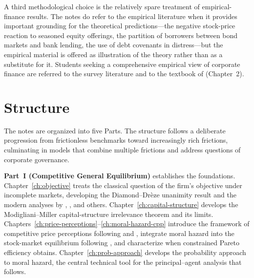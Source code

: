 \documentclass[11pt,a4paper,oneside]{book}
\theoremstyle{plain}
\theoremstyle{definition}
\theoremstyle{remark}
\numberwithin{equation}{chapter}
\begin{document}
A third methodological choice is the relatively spare treatment of empirical-finance results.
The notes do refer to the empirical literature when it provides important grounding for the theoretical predictions---the negative stock-price reaction to seasoned equity offerings, the partition of borrowers between bond markets and bank lending, the use of debt covenants in distress---but the empirical material is offered as illustration of the theory rather than as a substitute for it.
Students seeking a comprehensive empirical view of corporate finance are referred to the survey literature and to the textbook of \citet{Tirole2006} (Chapter~2).

\section*{Structure}

The notes are organized into five Parts.
The structure follows a deliberate progression from frictionless benchmarks toward increasingly rich frictions, culminating in models that combine multiple frictions and address questions of corporate governance.

\textbf{Part~I (Competitive General Equilibrium)} establishes the foundations.
Chapter~\ref{ch:objective} treats the classical question of the firm's objective under incomplete markets, developing the Diamond--Drèze unanimity result and the modern analyses by \citet{MagillQuinzii2008}, \citet{BritzHeringsPredtetchinski2013}, and others.
Chapter~\ref{ch:capital-structure} develops the Modigliani--Miller capital-structure irrelevance theorem and its limits.
Chapters~\ref{ch:price-perceptions}--\ref{ch:moral-hazard-cpp} introduce the framework of competitive price perceptions following \citet{BisinGottardiRuta2015} and \citet{BisinClementiGottardi2025}, integrate moral hazard into the stock-market equilibrium following \citet{MagillQuinzii2002}, and characterize when constrained Pareto efficiency obtains.
Chapter~\ref{ch:prob-approach} develops the probability approach to moral hazard, the central technical tool for the principal--agent analysis that follows.
\end{document}
